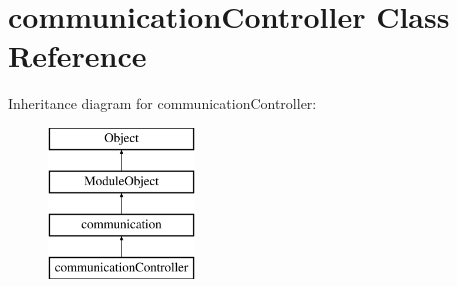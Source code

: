 \hypertarget{classcommunicationController}{\section{communication\+Controller Class Reference}
\label{classcommunicationController}
}
Inheritance diagram for communication\+Controller\+:\begin{figure}[H]
\begin{center}
\leavevmode
\includegraphics[height=4.000000cm]{classcommunicationController}
\end{center}
\end{figure}
